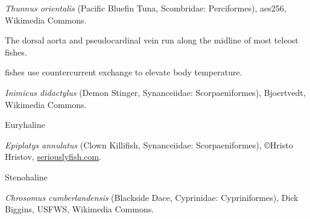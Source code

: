 \documentclass[t]{beamer}
\begin{document}

{
\begin{frame}[b,plain]

\tiny\textcolor{white!80!black}{\textit{Thunnus orientalis} (Pacific Bluefin Tuna, Scombridae: Perciformes), aes256, Wikimedia Commons.}
\end{frame}
}


{
\begin{frame}[b,plain]{The dorsal aorta and pseudocardinal vein run along the midline of most teleost fishes.}

\end{frame}
}

{
\begin{frame}[b,plain]{ fishes use countercurrent exchange to elevate body temperature.}

\end{frame}
}

{
\begin{frame}[b,plain]

\tiny\textcolor{white!20!black}{\textit{Inimicus didactylus} (Demon Stinger, Synanceiidae: Scorpaeniformes), Bjoertvedt, Wikimedia Commons.}
\end{frame}
}

{
\begin{frame}[b,plain]{\textcolor{orange5}{Euryhaline} \textcolor{white}{fishes tolerate a wide range of salinity.}}

\hfill\tiny\textcolor{white!80!black}{\textit{Epiplatys annulatus} (Clown Killifish, Synanceiidae: Scorpaeniformes), \copyright Hristo Hristov, \url{seriouslyfish.com}.}
\end{frame}
}

{
\begin{frame}[b,plain]{\textcolor{orange5}{Stenohaline} \textcolor{white}{fishes tolerate a narrow range of salinity.}}

\hfill\tiny\textcolor{white!80!black}{\textit{Chrosomus cumberlandensis} (Blackside Dace, Cyprinidae: Cypriniformes), Dick Biggins, USFWS, Wikimedia Commons.}
\end{frame}
}
\end{document}
